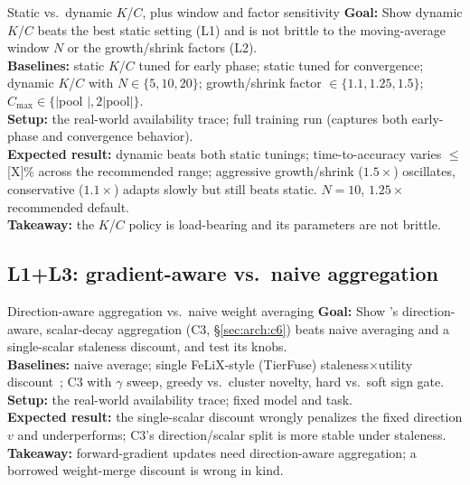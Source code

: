 \begin{plannedexp}{Static vs.\ dynamic $K$/$C$, plus window and factor sensitivity}
  \textbf{Goal:} Show dynamic $K$/$C$ beats the best static setting
  (L1) and is not brittle to the moving-average window $N$ or the
  growth/shrink factors (L2).\\[3pt]
  \textbf{Baselines:} static $K$/$C$ tuned for early phase; static
  tuned for convergence; dynamic $K$/$C$ with $N \in \{5, 10, 20\}$;
  growth/shrink factor $\in \{1.1, 1.25, 1.5\}$; $C_{\max} \in
  \{|$pool $|, 2|$pool$|\}$.\\[3pt]
  \textbf{Setup:} the real-world availability trace; full training run
  (captures both early-phase and convergence behavior).\\[3pt]
  \textbf{Expected result:} dynamic beats both static tunings;
  time-to-accuracy varies $\le$[X]\% across the recommended range;
  aggressive growth/shrink ($1.5\times$) oscillates, conservative
  ($1.1\times$) adapts slowly but still beats static. $N=10$,
  $1.25\times$ recommended default.\\[3pt]
  \textbf{Takeaway:} the $K$/$C$ policy is load-bearing and its
  parameters are not brittle.
\end{plannedexp}

\subsection{L1+L3: gradient-aware vs.\ naive aggregation}
\label{sec:ablation:c3}

\begin{plannedexp}{Direction-aware aggregation vs.\ naive weight averaging}
  \textbf{Goal:} Show \sys{}'s direction-aware, scalar-decay
  aggregation (C3, \S\ref{sec:arch:c6}) beats naive averaging and a
  single-scalar staleness discount, and test its knobs.\\[3pt]
  \textbf{Baselines:} naive average; single FeLiX-style (TierFuse)
  staleness$\times$utility discount~\cite{garg2026felix}; \sys{} C3
  with $\gamma$ sweep, greedy vs.\ cluster novelty, hard vs.\ soft
  sign gate.\\[3pt]
  \textbf{Setup:} the real-world availability trace; fixed model and
  task.\\[3pt]
  \textbf{Expected result:} the single-scalar discount wrongly
  penalizes the fixed direction $v$ and underperforms; C3's
  direction/scalar split is more stable under staleness.\\[3pt]
  \textbf{Takeaway:} forward-gradient updates need direction-aware
  aggregation; a borrowed weight-merge discount is wrong in kind.
\end{plannedexp}

